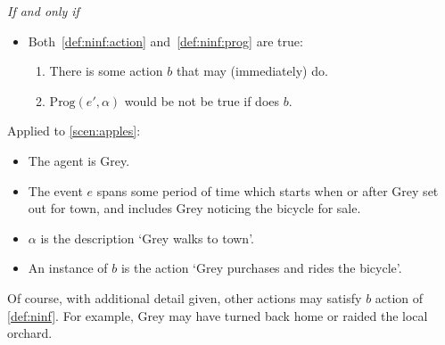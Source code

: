 \begin{note}
\begin{definition}[\ninf{2}]
    \emph{If and only if}

    \begin{itemize}
    \item
      Both~\ref{def:ninf:action} and~\ref{def:ninf:prog} are true:
      \begin{enumerate}[label=\alph*., ref=(\alph*)]
      \item
        \label{def:ninf:action}
        There is some action \(b\) that \vAgent{} may (immediately) do.
      \item
        \label{def:ninf:prog}
        \(\text{Prog}(e', \alpha)\) would be not be true if \vAgent{} does \(b\).
      \end{enumerate}
    \end{itemize}
    \vspace{-\baselineskip}
  \end{definition}

  \noindent%
  Applied to \autoref{scen:apples}:

  \begin{itemize}[noitemsep]
  \item
    The agent is Grey.
  \item
    The event \(e\) spans some period of time which starts when or after Grey set out for town, and includes Grey noticing the bicycle for sale.
  \item
    \(\alpha\) is the description `Grey walks to town'.
  \item
    An instance of \(b\) is the action `Grey purchases and rides the bicycle'.
  \end{itemize}

  \noindent%
  Of course, with additional detail given, other actions may satisfy \(b\) action of \autoref{def:ninf}.
  For example, Grey may have turned back home or raided the local orchard.
\end{note}

